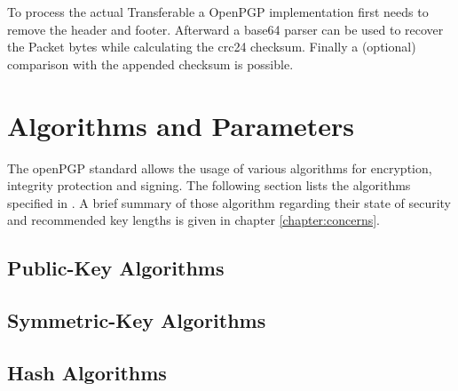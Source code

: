 To process the actual Transferable a OpenPGP implementation first needs to remove the header and footer. Afterward a base64 parser can be used to recover the Packet bytes while calculating the crc24 checksum. Finally a (optional) comparison with the appended checksum is possible.



\section{Algorithms and Parameters}



The openPGP standard allows the usage of various algorithms for encryption, integrity protection and signing. The following section lists the algorithms specified in \citep[section 9]{RFC4880}. A brief summary of those algorithm regarding their state of security and recommended key lengths is given in chapter \ref{chapter:concerns}.

\subsection{Public-Key Algorithms}

\subsection{Symmetric-Key Algorithms}

\subsection{Hash Algorithms}

